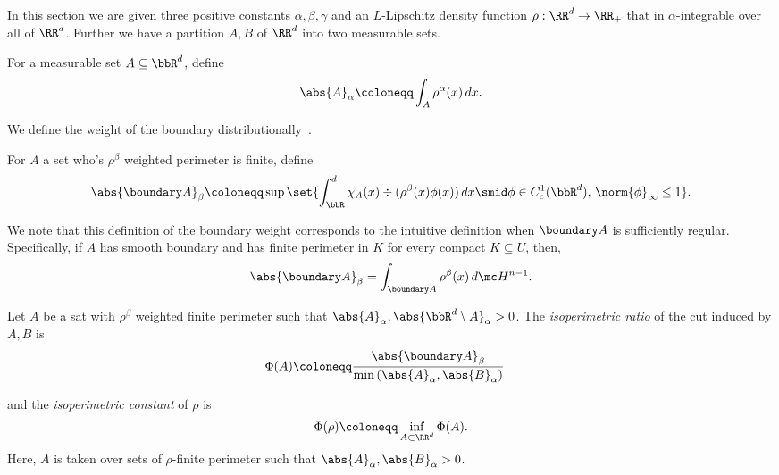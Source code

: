 In this section we are given three positive constants
$\alpha,\beta,\gamma$ and an $L$-Lipschitz density function 
$\rho:\RR^d \to \RR_+$ that in $\alpha$-integrable over all of $\RR^d$.
Further we have a partition $A,B$ of $\RR^d$ into two measurable sets.

\begin{definition}
For a measurable set $A\subseteq \bbR^d$, define
\begin{align*}
\abs{A}_\alpha \coloneqq \int_A \rho^\alpha(x)\,dx.
\end{align*}
\end{definition}

We define the weight of the boundary distributionally~\cite{betta2008weighted,parini2011introduction}.
\begin{definition}
\label{def:betaBdy}
For $A$ a set who's $\rho^{\beta}$ weighted perimeter is finite, define
\begin{align*}
\abs{\boundary A}_\beta \coloneqq \sup\set{\int_\bbR^d \chi_A(x)
  \div(\rho^\beta (x) \phi(x))\,dx\smid \phi\in C_c^1(\bbR^d),\, \norm{\phi}_{\infty}\leq 1}.
\end{align*}
\end{definition}

\begin{remark}
We note that this definition of the boundary weight corresponds to the
intuitive definition when $\boundary A$ is sufficiently
regular. Specifically, if $A$ has smooth boundary and
has finite perimeter in $K$ for every compact $K\subseteq U$, then,
\begin{align*}
\abs{\boundary A}_\beta = \int_{\boundary A} \rho^\beta(x)\,d \mc H^{n-1}.
\end{align*}
\end{remark}


\begin{definition}
  Let $A$ be a sat with $\rho^{\beta}$ weighted finite perimeter such
  that $\abs{A}_\alpha,\abs{\bbR^d\setminus A}_\alpha >0$. The
  \textit{isoperimetric ratio} of the cut induced by $A,B$ is
\begin{align*}
\Phi(A) &\coloneqq \frac{\abs{\boundary A}_\beta}{\min\left(\abs{A}_\alpha,\abs{B}_\alpha\right)}
\end{align*}

and the \textit{isoperimetric constant} of $\rho$ is
\begin{align*}
\Phi(\rho)\coloneqq \inf_{A \subset \RR^d} \Phi(A).
\end{align*}
Here, $A$ is taken over sets of $\rho$-finite perimeter such that $\abs{A}_\alpha,\abs{B}_\alpha>0$.
\end{definition}

